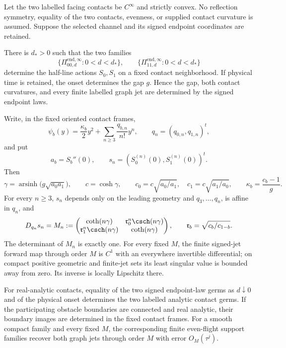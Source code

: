 \begin{theorem}
\label{thm:v22-signed-rigidity}
Let the two labelled facing contacts be $C^\infty$ and strictly convex.  No
reflection symmetry, equality of the two contacts, evenness, or supplied
contact curvature is assumed.  Suppose the selected channel and its signed
endpoint coordinates are retained.

There is $d_*>0$ such that the two families
\[
 \{\Pi^{\mathrm{end},\infty}_{00,d}:0<d<d_*\},\qquad
 \{\Pi^{\mathrm{end},\infty}_{11,d}:0<d<d_*\}
\]
determine the half-line actions $S_0,S_1$ on a fixed contact neighborhood.
If physical time is retained, the onset determines the gap $g$.  Hence the
gap, both contact curvatures, and every finite labelled graph jet are
determined by the signed endpoint laws.

Write, in the fixed oriented contact frames,
\begin{equation}\label{eq:v22-general-contact-jets}
 \psi_b(y)=\frac{\kappa_b}{2}y^2+
       \sum_{n\ge3}\frac{q_{b,n}}{n!}y^n,
 \qquad q_n=(q_{0,n},q_{1,n})^t,
\end{equation}
and put
\[
 a_b=S_b''(0),\qquad
 s_n=(S_0^{(n)}(0),S_1^{(n)}(0))^t.
\]
Then
\begin{equation}\label{eq:v22-leading-recovery}
 \gamma=\operatorname{arsinh}\!\bigl(g\sqrt{a_0a_1}\bigr),\qquad
 c=\cosh\gamma,
 \qquad
 c_0=c\sqrt{a_0/a_1},\quad c_1=c\sqrt{a_1/a_0},
 \qquad
 \kappa_b=\frac{c_b-1}{g}.
\end{equation}
For every $n\ge3$, $s_n$ depends only on the leading geometry and
$q_3,\ldots,q_n$, is affine in $q_n$, and
\begin{equation}\label{eq:v22-general-jet-block}
 D_{q_n}s_n=M_n:=
 \begin{pmatrix}
 \coth(n\gamma)&\mathfrak r_0^n\csch(n\gamma)\\
 \mathfrak r_1^n\csch(n\gamma)&\coth(n\gamma)
 \end{pmatrix},
 \qquad
 \mathfrak r_b=\sqrt{c_b/c_{1-b}}.
\end{equation}
The determinant of $M_n$ is exactly one.  For every fixed $M$, the finite
signed-jet forward map through order $M$ is $C^1$ with an everywhere
invertible differential; on compact positive geometric and finite-jet sets
its least singular value is bounded away from zero.  Its inverse is locally
Lipschitz there.

For real-analytic contacts, equality of the two signed endpoint-law germs as
$d\downarrow0$ and of the physical onset determines the two labelled analytic
contact germs.  If the participating obstacle boundaries are connected and
real analytic, their boundary images are determined in the fixed contact
frames.  For a smooth compact family and every fixed $M$, the corresponding
finite even-flight support families recover both graph jets through order
$M$ with error $O_M(\tau^j)$.
\end{theorem}


